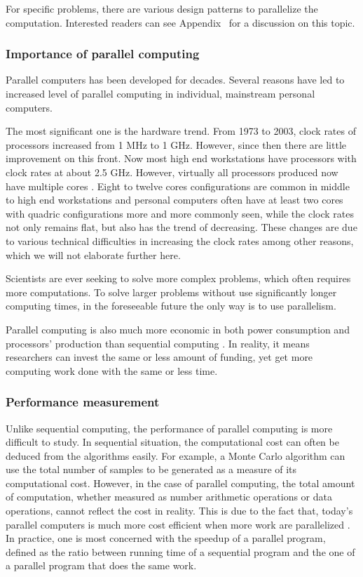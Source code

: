 For specific problems, there are various design patterns to parallelize the
computation. Interested readers can see Appendix~ for a discussion on this topic.

\subsubsection{Importance of parallel computing}
\label{ssub:Importance of parallel computing}

Parallel computers has been developed for decades. Several reasons have led to
increased level of parallel computing in individual, mainstream personal
computers.

The most significant one is the hardware trend. From 1973 to 2003, clock rates
of processors increased from 1 MHz to 1 GHz. However, since then there are
little improvement on this front. Now most high end workstations have
processors with clock rates at about 2.5 GHz. However, virtually all
processors produced now have multiple cores \cite{parallel}. Eight to twelve
cores configurations are common in middle to high end workstations and
personal computers often have at least two cores with quadric configurations
more and more commonly seen, while the clock rates not only remains flat, but
also has the trend of decreasing. These changes are due to various technical
difficulties in increasing the clock rates among other reasons, which we will
not elaborate further here.

Scientists are ever seeking to solve more complex problems, which often
requires more computations. To solve larger problems without use significantly
longer computing times, in the foreseeable future the only way is to use
parallelism.

Parallel computing is also much more economic in both power consumption and
processors' production than sequential computing \cite{parallel}. In reality,
it means researchers can invest the same or less amount of funding, yet get
more computing work done with the same or less time.

\subsubsection{Performance measurement}
\label{ssub:Performance measurement}

Unlike sequential computing, the performance of parallel computing is more
difficult to study. In sequential situation, the computational cost can often
be deduced from the algorithms easily. For example, a Monte Carlo algorithm
can use the total number of samples to be generated as a measure of its
computational cost. However, in the case of parallel computing, the total
amount of computation, whether measured as number arithmetic operations or
data operations, cannot reflect the cost in reality. This is due to the fact
that, today's parallel computers is much more cost efficient when more work
are parallelized \cite{parallel}. In practice, one is most concerned with the
speedup of a parallel program, defined as the ratio between running time of a
sequential program and the one of a parallel program that does the same work.

